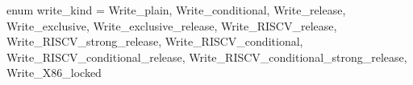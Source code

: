 enum write_kind = {
  Write_plain,
  Write_conditional,
  Write_release,
  Write_exclusive,
  Write_exclusive_release,
  Write_RISCV_release,
  Write_RISCV_strong_release,
  Write_RISCV_conditional,
  Write_RISCV_conditional_release,
  Write_RISCV_conditional_strong_release,
  Write_X86_locked
}
